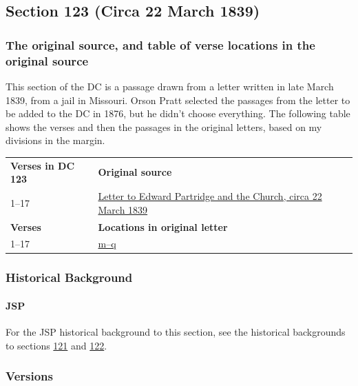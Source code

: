 \subsection{Section 123 (Circa 22 March 1839)}
	\label{DC123}
	
	\subsubsection{The original source, and table of verse locations in the original source}
	
		This section of the DC is a passage drawn from a letter written in late March 1839, from a jail in Missouri. Orson Pratt selected the passages from the letter to be added to the DC in 1876, but he didn't choose everything. The following table shows the verses and then the passages in the original letters, based on my divisions in the margin.
		
		\begin{table}[H]
			\begin{tabular}{p{4cm}p{10cm}}
				\textbf{Verses in DC 123} & \textbf{Original source} \\
				1--17 & \hyperref[EMS-1839-JS-CIR-22-MAR-1839]{Letter to Edward Partridge and the Church, circa 22 March 1839} \\
				\textbf{Verses} & \textbf{Locations in original letter} \\
				1--17 & \hyperlink{EMS-1839-JS-CIR-22-MAR-1839-m}{m--q} \\
			\end{tabular}
		\end{table}
		
	\subsubsection{Historical Background}
		\label{DC123-HB}
		
		\paragraph{JSP}
		
			For the JSP historical background to this section, see the historical backgrounds to sections \hyperref[DC121-HB]{121} and \hyperref[DC122-HB]{122}.

	\subsubsection{Versions}
		\label{DC123-V}
		
